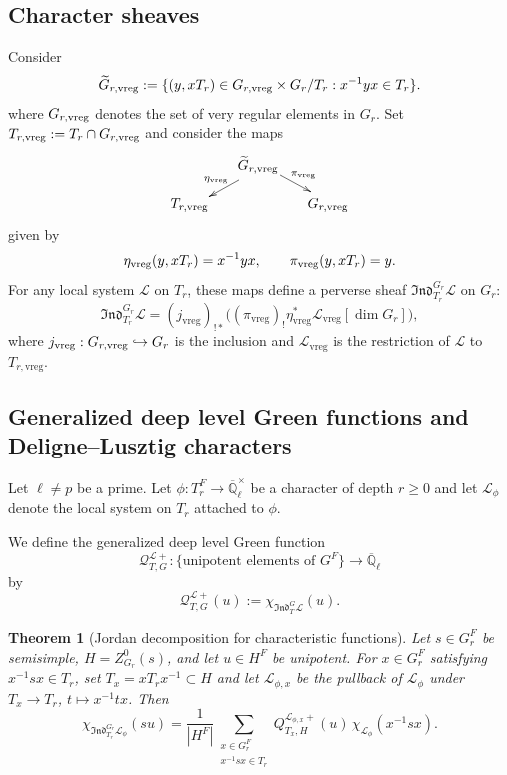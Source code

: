\documentclass[11pt,letterpaper]{amsart}
\newcommand{\ov}{\overline}
\newtheorem{theorem}{Theorem}
\theoremstyle{definition}
\numberwithin{equation}{section}
\numberwithin{theorem}{section}
\begin{document}
\subsection{Character sheaves}
Consider 
\begin{equation*}
  \widetilde G_{r,{\rm vreg}} := \{(y,xT_r) \in G_{r, {\rm vreg}} \times G_r/T_r : x^{-1} y x \in T_r\}.
\end{equation*} 
where $G_{r,{\rm vreg}}$ denotes the set of very regular elements in
$G_r$.  Set $T_{r,{\rm vreg}}:=T_r\cap G_{r,{\rm vreg}}$ and consider
the maps
\begin{equation*}
\xymatrix@R=10pt@C=15pt{
    & \widetilde G_{r,{\rm vreg}} \ar@<2pt>[dl]_{\eta_{\rm{vreg}}} \ar@<2pt>[dr]^{\pi_{{\rm vreg}}} \\
    T_{r, {\rm vreg}} & & G_{r,{\rm vreg}}}
\end{equation*}
given by
\begin{equation*}
  \eta_{{\rm vreg}}(y,xT_r) = x^{-1} y x, \qquad \pi_{{\rm vreg}}(y,xT_r) = y.
\end{equation*}
For any local system $\mathcal{L}$ on $T_r$, these maps define a perverse
sheaf $\mathfrak{Ind}^{G_r}_{T_r}\mathcal{L}$ on $G_r$:
\[
\mathfrak{Ind}^{G_r}_{T_r}\mathcal{L}
=(j_{\mathrm{vreg}})_{!*}
 \bigl((\pi_{\mathrm{vreg}})_!\eta_{\mathrm{vreg}}^*
 \mathcal{L}_{\mathrm{vreg}}[\dim G_r]\bigr),
\]
where $j_{{\rm vreg}}:G_{r,{\rm vreg}}\hookrightarrow G_r$ is the
inclusion and $\mathcal{L}_{\mathrm{vreg}}$ is the restriction of
$\mathcal{L}$ to $T_{r,\mathrm{vreg}}$.
\subsection{Generalized deep level Green functions and Deligne--Lusztig characters}
Let $\ell \neq p$ be a prime. Let $\phi: T^F_r \to \ov {\mathbb{Q}}_\ell^\times$ be a character of depth $r\geq 0$ and let $\mathcal{L}_\phi$ denote the local system on $T_r$ attached to $\phi$.

We define the generalized deep level Green function
\[
 \mathcal{Q}_{T,G}^{\mathcal L+}:
 \{\text{unipotent elements of }G^F\}
 \longrightarrow\overline{\mathbb Q}_\ell
\]
by
\[
 \mathcal{Q}_{T,G}^{\mathcal L+}(u)
 :=\chi_{\mathfrak{Ind}^{G}_{T}\mathcal L}(u).
\]

\begin{theorem}[Jordan decomposition for characteristic functions]
Let $s\in G_r^F$ be semisimple, $H=Z_{G_r}^0(s)$, and let
$u\in H^F$ be unipotent.  For
$x\in G_r^F$ satisfying $x^{-1}sx\in T_r$, set
$T_x=xT_rx^{-1}\subset H$ and let $\mathcal L_{\phi,x}$ be the pullback
of $\mathcal L_\phi$ under $T_x\to T_r$, $t\mapsto x^{-1}tx$.  Then
\[
 \chi_{\mathfrak{Ind}^{G_r}_{T_r}\mathcal L_\phi}(su)
 =\frac{1}{|H^F|}
  \sum_{\substack{x\in G_r^F\\x^{-1}sx\in T_r}}
  Q_{T_x,H}^{\mathcal L_{\phi,x}+}(u)\,
  \chi_{\mathcal L_\phi}(x^{-1}sx).
\]
\end{theorem}
\end{document}
